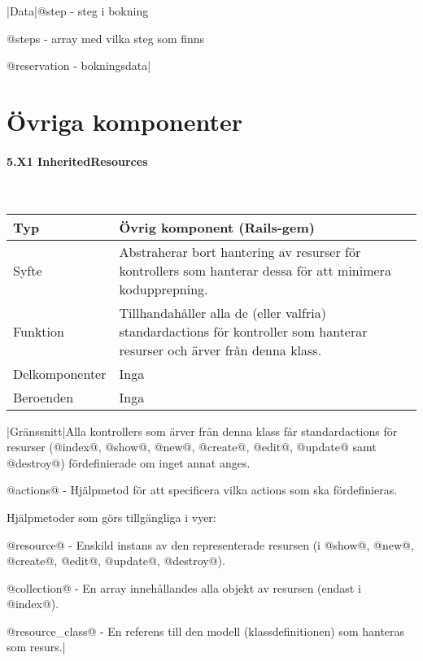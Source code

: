 \documentclass[a4paper, twoside, 11pt, titlepage]{article}
\begin{document}
			|Data|@step - steg i bokning

			@steps - array med vilka steg som finns

			@reservation - bokningsdata|

\clearpage
\section{Övriga komponenter}



			\paragraph{5.X1 InheritedResources}\

			\begin {table} [ht] \begin{tabular} {  p{3.5cm} p{9.6cm} }
				\hline
				Typ & Övrig komponent (Rails-gem)  \\
				\hline
				Syfte & Abstraherar bort hantering av resurser för kontrollers som hanterar dessa för att minimera kodupprepning.  \\
				\hline
				Funktion & Tillhandahåller alla de (eller valfria) standardactions för kontroller som hanterar resurser och ärver från denna klass.  \\
				\hline
				Delkomponenter & Inga  \\
				\hline
				Beroenden & Inga  \\
				\hline
			\end{tabular} \end{table} \FloatBarrier
			\vspace{6mm}

			|Gränssnitt|Alla kontrollers som ärver från denna klass får standardactions för resurser (@index@, @show@, @new@, @create@, @edit@, @update@ samt @destroy@) fördefinierade om inget annat anges.

			@actions@ - Hjälpmetod för att specificera vilka actions som ska fördefinieras.

			Hjälpmetoder som görs tillgängliga i vyer:

			@resource@ - Enskild instans av den representerade resursen (i @show@, @new@, @create@, @edit@, @update@, @destroy@).

			@collection@ - En array innehållandes alla objekt av resursen (endast i @index@).

			@resource\_class@ - En referens till den modell (klassdefinitionen) som hanteras som resurs.|
\end{document}
